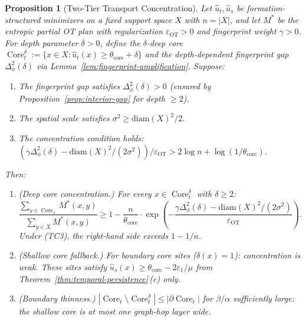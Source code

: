 \documentclass[lettersize,journal]{IEEEtran}
\newtheorem{proposition}[theorem]{Proposition}
\DeclareMathOperator{\Core}{Core}
\begin{document}
\begin{proposition}[Two-Tier Transport Concentration]
\label{prop:transport-concentration}
Let $\hat{u}_t, \hat{u}_s$ be formation-structured minimizers on a fixed support space $X$ with $n = |X|$, and let $M^*$ be the entropic partial OT plan with regularization $\varepsilon_{\mathrm{OT}} > 0$ and fingerprint weight $\gamma > 0$. For depth parameter $\delta > 0$, define the $\delta$-deep core $\Core_t^\delta := \{x \in X : \hat{u}_t(x) \geq \theta_{\mathrm{core}} + \delta\}$ and the depth-dependent fingerprint gap $\Delta_\phi^2(\delta)$ via Lemma~\ref{lem:fingerprint-amplification}. Suppose:
\begin{enumerate}
\item[\emph{(TC1)}] The fingerprint gap satisfies $\Delta_\phi^2(\delta) > 0$ (ensured by Proposition~\ref{prop:interior-gap} for depth $\geq 2$).
\item[\emph{(TC2)}] The spatial scale satisfies $\sigma^2 \geq \mathrm{diam}(X)^2/2$.
\item[\emph{(TC3)}] The concentration condition holds: $(\gamma\Delta_\phi^2(\delta) - \mathrm{diam}(X)^2/(2\sigma^2))/\varepsilon_{\mathrm{OT}} > 2\log n + \log(1/\theta_{\mathrm{core}})$.
\end{enumerate}
Then:
\begin{enumerate}
\item[(a)] \emph{(Deep core concentration.)} For every $x \in \Core_t^\delta$ with $\delta \geq 2$:
\begin{equation}
\label{eq:deep-core-concentration}
\frac{\sum_{y \in \Core_s} M^*(x,y)}{\sum_{y \in X} M^*(x,y)} \geq 1 - \frac{n}{\theta_{\mathrm{core}}} \cdot \exp\!\left(-\frac{\gamma\Delta_\phi^2(\delta) - \mathrm{diam}(X)^2/(2\sigma^2)}{\varepsilon_{\mathrm{OT}}}\right).
\end{equation}
Under \emph{(TC3)}, the right-hand side exceeds $1 - 1/n$.
\item[(b)] \emph{(Shallow core fallback.)} For boundary core sites ($\delta(x) = 1$): concentration is weak. These sites satisfy $\hat{u}_s(x) \geq \theta_{\mathrm{core}} - 2\varepsilon_1/\mu$ from Theorem~\ref{thm:temporal-persistence}\,(c) only.
\item[(c)] \emph{(Boundary thinness.)} $|\Core_t \setminus \Core_t^\delta| \leq |\partial\Core_t|$ for $\beta/\alpha$ sufficiently large: the shallow core is at most one graph-hop layer wide.
\end{enumerate}
\end{proposition}
\end{document}
